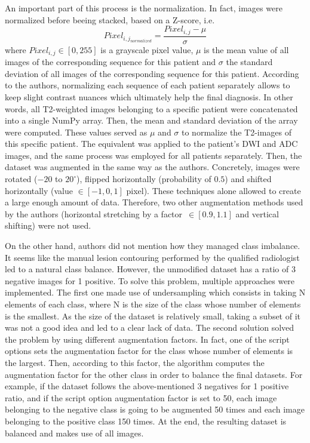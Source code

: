 An important part of this process is the normalization. In fact, images were normalized before beeing stacked, based on a Z-score, i.e. 
\begin{equation}
\label{eq:normalization}
	Pixel_{{i,j}_{normalized}} = \frac{Pixel_{i,j} - \mu}{\sigma}
\end{equation}
\noindent where $Pixel_{i,j} \in [0,255]$ is a grayscale pixel value, $\mu$ is the mean value of all images of the corresponding sequence for this patient and $\sigma$ the standard deviation of all images of the corresponding sequence for this patient. According to the authors, normalizing each sequence of each patient separately allows to keep slight contrast nuances which ultimately help the final diagnosis. In other words, all T2-weighted images belonging to a specific patient were concatenated into a single NumPy array. Then, the mean and standard deviation of the array were computed. These values served as $\mu$ and $\sigma$ to normalize the T2-images of this specific patient. The equivalent was applied to the patient's DWI and ADC images, and the same process was employed for all patients separately.
Then, the dataset was augmented in the same way as the authors. Concretely, images were rotated ($-20$ to $20^\circ$), flipped horizontally (probability of $0.5$) and shifted horizontally (value $\in [-1, 0, 1]$ pixel). These techniques alone allowed to create a large enough amount of data. Therefore, two other augmentation methods used by the authors (horizontal stretching by a \mbox{factor $\in [0.9,1.1]$} and vertical shifting) were not used.

On the other hand, authors did not mention how they managed class imbalance. It seems like the manual lesion contouring performed by the qualified radiologist led to a natural class balance. However, the unmodified dataset has a ratio of 3 negative images for 1 positive. To solve this problem, multiple approaches were implemented. The first one made use of undersampling which consists in taking N elements of each class, where N is the size of the class whose number of elements is the smallest. As the size of the dataset is relatively small, taking a subset of it was not a good idea and led to a clear lack of data. The second solution solved the problem by using different augmentation factors. In fact, one of the script options sets the augmentation factor for the class whose number of elements is the largest. Then, according to this factor, the algorithm computes the augmentation factor for the other class in order to balance the final datasets. For example, if the dataset follows the above-mentioned 3 negatives for 1 positive ratio, and if the script option augmentation factor is set to 50, each image belonging to the negative class is going to be augmented 50 times and each image belonging to the positive class 150 times. At the end, the resulting dataset is balanced and makes use of all images.

